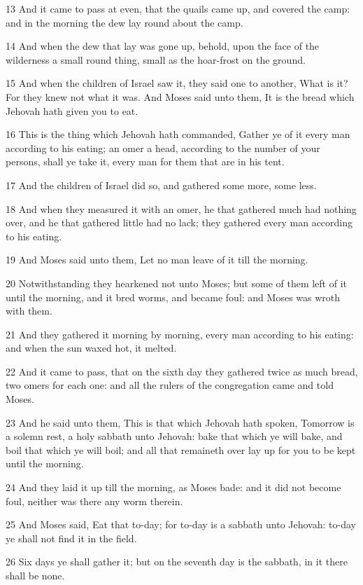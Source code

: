 \par 13 And it came to pass at even, that the quails came up, and covered the camp: and in the morning the dew lay round about the camp.
\par 14 And when the dew that lay was gone up, behold, upon the face of the wilderness a small round thing, small as the hoar-frost on the ground.
\par 15 And when the children of Israel saw it, they said one to another, What is it? For they knew not what it was. And Moses said unto them, It is the bread which Jehovah hath given you to eat.
\par 16 This is the thing which Jehovah hath commanded, Gather ye of it every man according to his eating; an omer a head, according to the number of your persons, shall ye take it, every man for them that are in his tent.
\par 17 And the children of Israel did so, and gathered some more, some less.
\par 18 And when they measured it with an omer, he that gathered much had nothing over, and he that gathered little had no lack; they gathered every man according to his eating.
\par 19 And Moses said unto them, Let no man leave of it till the morning.
\par 20 Notwithstanding they hearkened not unto Moses; but some of them left of it until the morning, and it bred worms, and became foul: and Moses was wroth with them.
\par 21 And they gathered it morning by morning, every man according to his eating: and when the sun waxed hot, it melted.
\par 22 And it came to pass, that on the sixth day they gathered twice as much bread, two omers for each one: and all the rulers of the congregation came and told Moses.
\par 23 And he said unto them, This is that which Jehovah hath spoken, Tomorrow is a solemn rest, a holy sabbath unto Jehovah: bake that which ye will bake, and boil that which ye will boil; and all that remaineth over lay up for you to be kept until the morning.
\par 24 And they laid it up till the morning, as Moses bade: and it did not become foul, neither was there any worm therein.
\par 25 And Moses said, Eat that to-day; for to-day is a sabbath unto Jehovah: to-day ye shall not find it in the field.
\par 26 Six days ye shall gather it; but on the seventh day is the sabbath, in it there shall be none.
